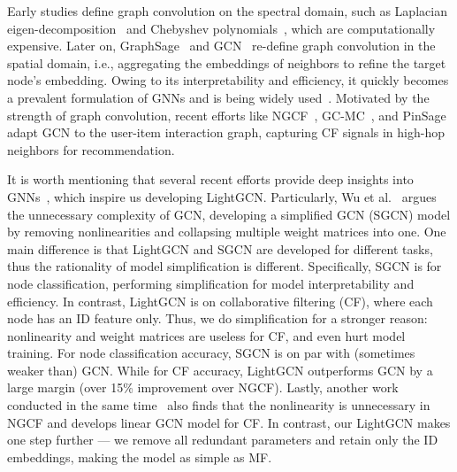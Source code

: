 Early studies define graph convolution on the spectral domain, such as Laplacian eigen-decomposition~\cite{DBLP:journals/corr/BrunaZSL13} and Chebyshev polynomials~\cite{FirstGCN}, which are computationally expensive.
Later on, GraphSage~\cite{GraphSAGE} and GCN~\cite{GCN} re-define graph convolution in the spatial domain, i.e., aggregating the embeddings of neighbors to refine the target node's embedding. Owing to its interpretability and efficiency, it quickly becomes a prevalent formulation of GNNs and is being widely used~\cite{DeepInf,Feng2019TOIS,zhao2019cross}.
Motivated by the strength of graph convolution, recent efforts like NGCF~\cite{NGCF}, GC-MC~\cite{GC-MC}, and PinSage~\cite{PinSage} adapt GCN to the user-item interaction graph, capturing CF signals in high-hop neighbors for recommendation.

It is worth mentioning that several recent efforts provide deep insights into GNNs~\cite{DeepInsights,ICLR19-APPNP,SGCN}, which inspire us developing LightGCN. Particularly, Wu et al.~\cite{SGCN} argues the unnecessary complexity of GCN, developing a simplified GCN (SGCN) model by removing nonlinearities and collapsing multiple weight matrices into one. 
One main difference is that LightGCN and SGCN are developed for different tasks, thus the rationality of model simplification is different. Specifically, SGCN is for node classification, performing simplification for model interpretability and efficiency. In contrast, LightGCN is on collaborative filtering (CF), where each node has an ID feature only. Thus, we do simplification for a stronger reason: nonlinearity and weight matrices are useless for CF, and even hurt model training. For node classification accuracy, SGCN is on par with (sometimes weaker than) GCN. While for CF accuracy, LightGCN outperforms GCN by a large margin (over 15\% improvement over NGCF). 
Lastly, another work conducted in the same time~\cite{LR-GCCF} also finds that the nonlinearity is unnecessary in NGCF and develops linear GCN model for CF. In contrast, our LightGCN makes one step further --- we remove all redundant parameters and retain only the ID embeddings, making the model as simple as MF. 


